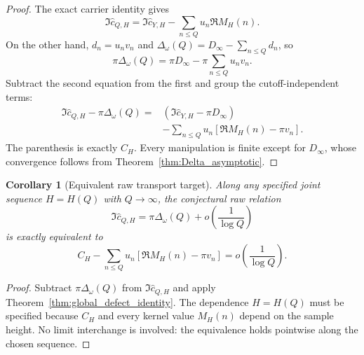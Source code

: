 \documentclass[11pt]{amsart}
\numberwithin{equation}{section}
\theoremstyle{plain}
\newtheorem{corollary}[theorem]{Corollary}
\theoremstyle{definition}
\theoremstyle{remark}
\newcommand{\1}{\mathbf{1}}
\begin{document}
\begin{proof}
The exact carrier identity gives
\begin{equation}
\Im\widehat c_{Q,H}
=
\Im\widehat c_{Y,H}
-
\sum_{n\leq Q}u_n\Re M_H(n).
\label{eq:global_defect_proof_carrier}
\end{equation}
On the other hand, \(d_n=u_nv_n\) and
\(\Delta_\omega(Q)=D_\infty-\sum_{n\leq Q}d_n\), so
\begin{equation}
\pi\Delta_\omega(Q)
=
\pi D_\infty
-
\pi\sum_{n\leq Q}u_nv_n.
\label{eq:global_defect_proof_Delta}
\end{equation}
Subtract the second equation from the first and group the cutoff-independent
terms:
\begin{align}
\Im\widehat c_{Q,H}-\pi\Delta_\omega(Q)
={}&
\left(\Im\widehat c_{Y,H}-\pi D_\infty\right)
\label{eq:global_defect_proof_group_one}
\\
&-
\sum_{n\leq Q}u_n
\left[\Re M_H(n)-\pi v_n\right].
\label{eq:global_defect_proof_group_two}
\end{align}
The parenthesis is exactly \(C_H\).  Every manipulation is finite except
for \(D_\infty\), whose convergence follows from
Theorem~\ref{thm:Delta_asymptotic}.
\end{proof}

\begin{corollary}[Equivalent raw transport target]
\label{cor:transport_target}
Along any specified joint sequence \(H=H(Q)\) with \(Q\to\infty\), the
conjectural raw relation
\begin{equation}
\Im\widehat c_{Q,H}
=
\pi\Delta_\omega(Q)
+
o\left(\frac1{\log Q}\right)
\label{eq:transport_relation}
\end{equation}
is exactly equivalent to
\begin{equation}
\boxed{
C_H
-
\sum_{n\leq Q}
u_n\left[
\Re M_H(n)-\pi v_n
\right]
=
o\left(\frac1{\log Q}\right).
}
\label{eq:equivalent_transport_target}
\end{equation}
\end{corollary}

\begin{proof}
Subtract \(\pi\Delta_\omega(Q)\) from
\(\Im\widehat c_{Q,H}\) and apply
Theorem~\ref{thm:global_defect_identity}.  The dependence
\(H=H(Q)\) must be specified because \(C_H\) and every kernel value
\(M_H(n)\) depend on the sample height.  No limit interchange is involved:
the equivalence holds pointwise along the chosen sequence.
\end{proof}
\end{document}

